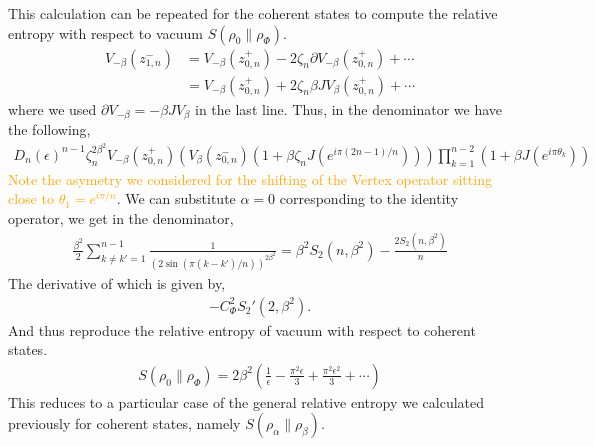\documentclass[11pt]{article}
\newcommand{\ep}{\epsilon}
\newcommand{\p}{\partial}
\newcommand{\lb}{\left(}
\newcommand{\rb}{\right)}
\newcommand{\JM}[1]{\textcolor{orange}{#1}}
\begin{document}
This calculation can be repeated for the coherent states to compute the relative entropy with respect to vacuum $S(\rho_0 \| \rho_\Phi)$.
\begin{align}
    V_{-\beta}(z_{1,n}^-) &= V_{-\beta}(z_{0,n}^+) - 2\zeta_n\p V_{-\beta}(z_{0,n}^+) + \cdots \\
    &=V_{-\beta}(z_{0,n}^+) + 2\zeta_n \beta J  V_\beta(z_{0,n}^+) + \cdots
\end{align}
where we used $\p V_{-\beta} = -\beta J V_\beta$ in the last line. 
Thus, in the denominator we have the following,
\begin{align}
    D_n(\ep)^{n-1} \zeta_n^{2\beta^2} V_{-\beta}(z_{0,n}^+)\lb V_\beta(z_{0,n}^-) (1+\beta \zeta_nJ(e^{i\pi (2n-1)/n}))\rb \prod_{k=1}^{n-2}(1+\beta J(e^{i\pi \theta_k}))
\end{align}
\JM{Note the asymetry we considered for the shifting of the Vertex operator sitting close to $\theta_1 = e^{i\pi/n}$}.
We can substitute $\alpha = 0$ corresponding to the identity operator, we get in the denominator,
\begin{align}
    \frac{\beta^2}{2}\sum_{k\neq k'=1}^{n-1}\frac{1}{(2\sin(\pi(k-k')/n))^{2\beta^2}} = \beta^2 S_2(n,\beta^2) - \frac{2S_2(n,\beta^2)}{n}
\end{align}
The derivative of which is given by,
\begin{align}
    -C_\Phi^2 S_2'(2,\beta^2).
\end{align}
And thus reproduce the relative entropy of vacuum with respect to coherent states. 
\begin{align}
    S(\rho_0 \| \rho_\Phi) = 2\beta^2\lb \frac{1}{\ep} - \frac{\pi^2\ep}{3} + \frac{\pi^2\ep^2}{3} + \cdots \rb
\end{align}
This reduces to a particular case of the general relative entropy we calculated previously for coherent states, namely $S(\rho_\alpha \| \rho_\beta)$. 
\end{document}

